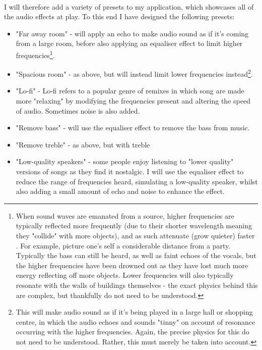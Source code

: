\paragraph{}
I will therefore add a variety of presets to my application, which showcases all of the audio effects at play. To this end I have designed the following presets:
\begin{itemize}
	\item "Far away room" - will apply an echo to make audio sound as if it's coming from a large room, before also applying an equaliser effect to limit higher frequencies\footnote{
		When sound waves are emanated from a source, higher frequencies are typically reflected more frequently (due to their shorter wavelength meaning they "collide" with more objects), and as such attenuate (grow quieter) faster . For example, picture one's self a considerable distance from a party. Typically the bass can still be heard, as well as faint echoes of the vocals, but the higher frequencies have been drowned out as they have lost much more energy reflecting off more objects. Lower frequencies will also typically resonate with the walls of buildings themselves - the exact physics behind this are complex, but thankfully do not need to be understood.
	}.
	\item "Spacious room" - as above, but will instead limit lower frequencies instead\footnote{
		This will make audio sound as if it's being played in a large hall or shopping centre, in which the audio echoes and sounds "tinny" on account of  resonance occurring with the higher frequencies. Again, the precise physics for this do not need to be understood. Rather, this must merely be taken into account.
	}.
	\item "Lo-fi" - Lo-fi refers to a popular genre of remixes in which song are made more "relaxing" by modifying the frequencies present and altering the speed of audio. Sometimes noise is also added.
	\item "Remove bass" - will use the equaliser effect to remove the bass from music.
	\item "Remove treble" - as above, but with treble
	\item "Low-quality speakers" - some people enjoy listening to "lower quality" versions of songs as they find it nostalgic. I will use the equaliser effect to reduce the range of frequencies heard, simulating a low-quality speaker, whilst also adding a small amount of echo and noise to enhance the effect.
\end{itemize}

